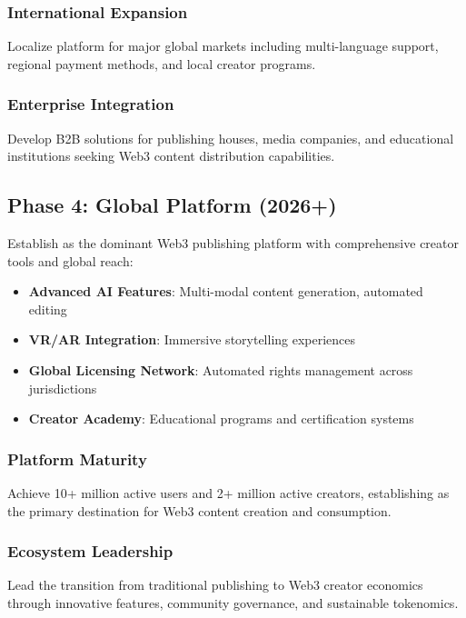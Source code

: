 \subsubsection{International Expansion}

Localize platform for major global markets including multi-language support, regional payment methods, and local creator programs.

\subsubsection{Enterprise Integration}

Develop B2B solutions for publishing houses, media companies, and educational institutions seeking Web3 content distribution capabilities.

\subsection{Phase 4: Global Platform (2026+)}

Establish \storyhouse{} as the dominant Web3 publishing platform with comprehensive creator tools and global reach:

\begin{itemize}
    \item \textbf{Advanced AI Features}: Multi-modal content generation, automated editing
    \item \textbf{VR/AR Integration}: Immersive storytelling experiences
    \item \textbf{Global Licensing Network}: Automated rights management across jurisdictions
    \item \textbf{Creator Academy}: Educational programs and certification systems
\end{itemize}

\subsubsection{Platform Maturity}

Achieve 10+ million active users and 2+ million active creators, establishing \storyhouse{} as the primary destination for Web3 content creation and consumption.

\subsubsection{Ecosystem Leadership}

Lead the transition from traditional publishing to Web3 creator economics through innovative features, community governance, and sustainable tokenomics.